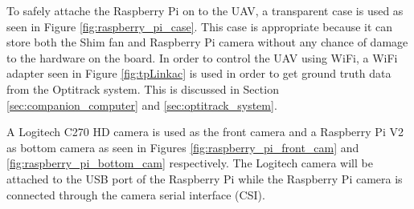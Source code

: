 \documentclass[../Head/report.tex]{subfiles}
\begin{document}
To safely attache the Raspberry Pi on to the UAV, a transparent case is used as seen in Figure \ref{fig:raspberry_pi_case}. This case is appropriate because it can store both the Shim fan and Raspberry Pi camera without any chance of damage to the hardware on the board. In order to control the UAV using WiFi, a WiFi adapter seen in Figure \ref{fig:tpLinkac} is used in order to get ground truth data from the Optitrack system. This is discussed in Section \ref{sec:companion_computer} and \ref{sec:optitrack_system}.

A Logitech C270 HD camera is used as the front camera and a Raspberry Pi V2 as bottom camera as seen in Figures \ref{fig:raspberry_pi_front_cam} and \ref{fig:raspberry_pi_bottom_cam} respectively. The Logitech camera will be attached to the USB port of the Raspberry Pi while the Raspberry Pi camera is connected through the camera serial interface (CSI). 
\end{document}
